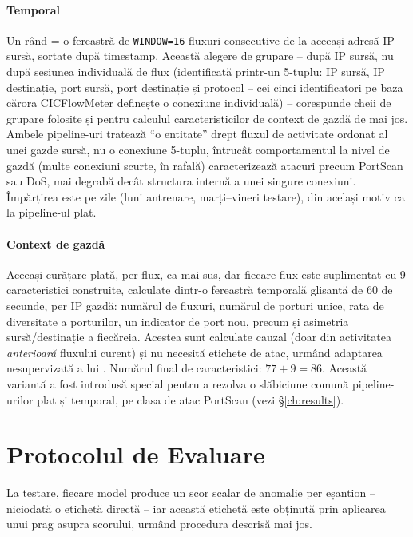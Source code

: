\paragraph{Temporal} Un rând = o fereastră de \texttt{WINDOW=16} fluxuri consecutive de la aceeași adresă IP sursă, sortate după timestamp.
Această alegere de grupare -- după IP sursă, nu după sesiunea individuală de flux (identificată printr-un 5-tuplu: IP sursă, IP destinație, port sursă, port destinație și protocol -- cei cinci identificatori pe baza cărora CICFlowMeter definește o conexiune individuală) -- corespunde cheii de grupare folosite și pentru calculul caracteristicilor de context de gazdă de mai jos.
Ambele pipeline-uri tratează \enquote{o entitate} drept fluxul de activitate ordonat al unei gazde sursă, nu o conexiune 5-tuplu, întrucât comportamentul la nivel de gazdă (multe conexiuni scurte, în rafală) caracterizează atacuri precum PortScan sau DoS, mai degrabă decât structura internă a unei singure conexiuni. Împărțirea este pe zile (luni antrenare, marți--vineri testare), din același motiv ca la pipeline-ul plat.

\paragraph{Context de gazdă} Aceeași curățare plată, per flux, ca mai sus, dar fiecare flux este suplimentat cu 9 caracteristici construite, calculate dintr-o fereastră temporală glisantă de 60 de secunde, per IP gazdă: numărul de fluxuri, numărul de porturi unice, rata de diversitate a porturilor, un indicator de port nou, precum și asimetria sursă/destinație a fiecăreia. Acestea sunt calculate cauzal (doar din activitatea \emph{anterioară} fluxului curent) și nu necesită etichete de atac, urmând adaptarea nesupervizată a lui \textcite{raskovalov2024nids}. Numărul final de caracteristici: $77 + 9 = 86$. Această variantă a fost introdusă special pentru a rezolva o slăbiciune comună pipeline-urilor plat și temporal, pe clasa de atac PortScan (vezi \S\ref{ch:results}).


\section{Protocolul de Evaluare}
\label{sec:eval-protocol}

La testare, fiecare model produce un scor scalar de anomalie per eșantion -- niciodată o etichetă directă -- iar această etichetă este obținută prin aplicarea unui prag asupra scorului, urmând procedura descrisă mai jos.

